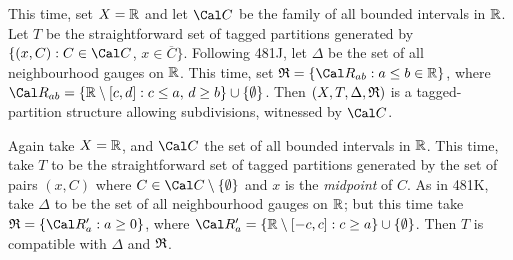  This time, set
$X=\Bbb R$ and let $\Cal C$ be the family of all bounded
intervals in $\Bbb R$.   Let $T$ be the straightforward set of
tagged partitions generated by
$\{(x,C):C\in\Cal C$, $x\in\overline{C}\}$.   Following 481J, let $\Delta$ be the set of all neighbourhood
gauges on $\Bbb R$.   This time, set
$\frak R=\{\Cal R_{ab}:a\le b\in\Bbb R\}$, where
$\Cal R_{ab}=\{\Bbb R\setminus[c,d]:c\le a,\,d\ge b\}\cup\{\emptyset\}$.
Then $(X,T,\Delta,\frak R)$ is a tagged-partition structure allowing
subdivisions, witnessed by $\Cal C$.


 Again take $X=\Bbb R$, and $\Cal C$ the
set of all
bounded intervals in $\Bbb R$.   This time, take $T$ to be the
straightforward set of tagged partitions generated by the set
of pairs $(x,C)$ where $C\in\Cal C\setminus\{\emptyset\}$ and $x$ is the 
{\it midpoint} of
$C$.   As in 481K, take $\Delta$ to be the set of all neighbourhood
gauges on
$\Bbb R$;  but this time take $\frak R=\{\Cal R'_a:a\ge 0\}$, where
$\Cal R'_a=\{\Bbb R\setminus[-c,c]:c\ge a\}\cup\{\emptyset\}$.   Then
$T$ is compatible with $\Delta$ and $\frak R$.

